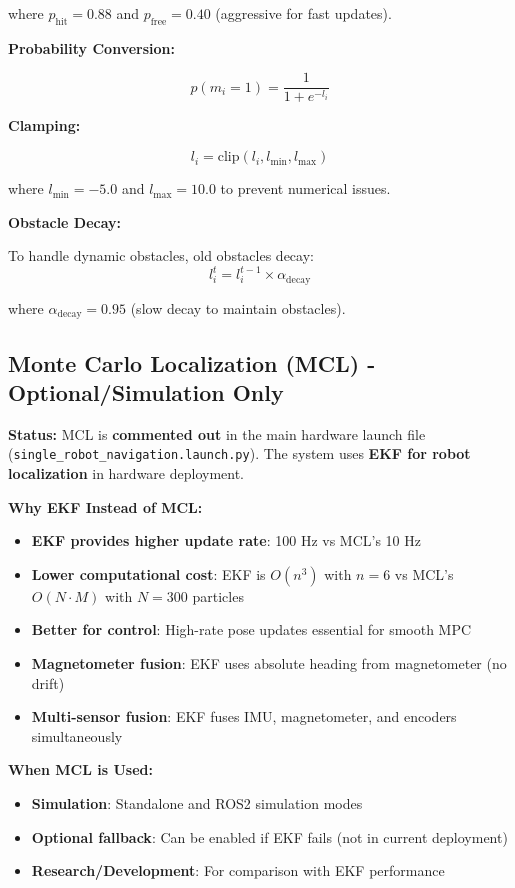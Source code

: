 \documentclass[11pt]{article}
\begin{document}
where $p_{\text{hit}} = 0.88$ and $p_{\text{free}} = 0.40$ (aggressive for fast updates).

\textbf{Probability Conversion:}

\[
p(m_i = 1) = \frac{1}{1 + e^{-l_i}}
\]

\textbf{Clamping:}

\[
l_i = \text{clip}(l_i, l_{\min}, l_{\max})
\]

where $l_{\min} = -5.0$ and $l_{\max} = 10.0$ to prevent numerical issues.

\textbf{Obstacle Decay:}

To handle dynamic obstacles, old obstacles decay:
\[
l_i^{t} = l_i^{t-1} \times \alpha_{\text{decay}}
\]

where $\alpha_{\text{decay}} = 0.95$ (slow decay to maintain obstacles).

\subsection{Monte Carlo Localization (MCL) - Optional/Simulation Only}

\textbf{Status:} MCL is \textbf{commented out} in the main hardware launch file (\texttt{single\_robot\_navigation.launch.py}). The system uses \textbf{EKF for robot localization} in hardware deployment.

\textbf{Why EKF Instead of MCL:}

\begin{itemize}
    \item \textbf{EKF provides higher update rate}: 100 Hz vs MCL's 10 Hz
    \item \textbf{Lower computational cost}: EKF is $O(n^3)$ with $n=6$ vs MCL's $O(N \cdot M)$ with $N=300$ particles
    \item \textbf{Better for control}: High-rate pose updates essential for smooth MPC
    \item \textbf{Magnetometer fusion}: EKF uses absolute heading from magnetometer (no drift)
    \item \textbf{Multi-sensor fusion}: EKF fuses IMU, magnetometer, and encoders simultaneously
\end{itemize}

\textbf{When MCL is Used:}

\begin{itemize}
    \item \textbf{Simulation}: Standalone and ROS2 simulation modes
    \item \textbf{Optional fallback}: Can be enabled if EKF fails (not in current deployment)
    \item \textbf{Research/Development}: For comparison with EKF performance
\end{itemize}
\end{document}
